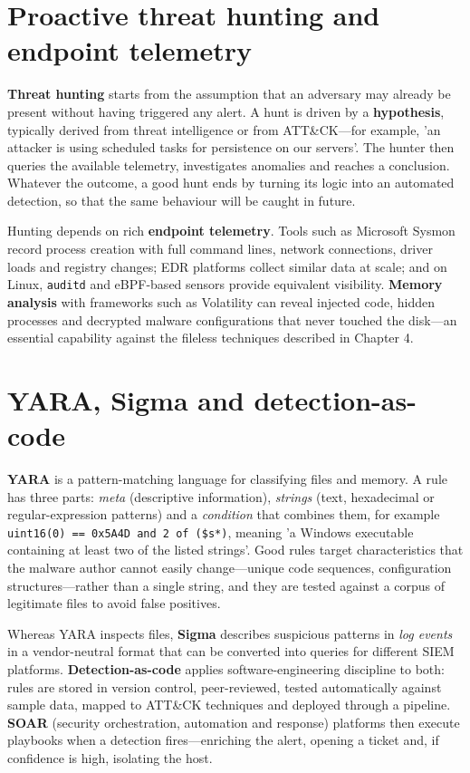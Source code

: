 \section{Proactive threat hunting and endpoint telemetry}\label{sec:11.3}
\textbf{Threat hunting} starts from the assumption that an adversary may already be present without having triggered any alert. A hunt is driven by a \textbf{hypothesis}, typically derived from threat intelligence or from ATT\&CK—for example, 'an attacker is using scheduled tasks for persistence on our servers'. The hunter then queries the available telemetry, investigates anomalies and reaches a conclusion. Whatever the outcome, a good hunt ends by turning its logic into an automated detection, so that the same behaviour will be caught in future.

Hunting depends on rich \textbf{endpoint telemetry}. Tools such as Microsoft Sysmon record process creation with full command lines, network connections, driver loads and registry changes; EDR platforms collect similar data at scale; and on Linux, \texttt{auditd} and eBPF-based sensors provide equivalent visibility. \textbf{Memory analysis} with frameworks such as Volatility can reveal injected code, hidden processes and decrypted malware configurations that never touched the disk—an essential capability against the fileless techniques described in Chapter 4.

\section{YARA, Sigma and detection-as-code}\label{sec:11.4}
\textbf{YARA} is a pattern-matching language for classifying files and memory. A rule has three parts: \emph{meta} (descriptive information), \emph{strings} (text, hexadecimal or regular-expression patterns) and a \emph{condition} that combines them, for example \texttt{uint16(0) == 0x5A4D and 2 of (\$s*)}, meaning 'a Windows executable containing at least two of the listed strings'. Good rules target characteristics that the malware author cannot easily change—unique code sequences, configuration structures—rather than a single string, and they are tested against a corpus of legitimate files to avoid false positives.

Whereas YARA inspects files, \textbf{Sigma} describes suspicious patterns in \emph{log events} in a vendor-neutral format that can be converted into queries for different SIEM platforms. \textbf{Detection-as-code} applies software-engineering discipline to both: rules are stored in version control, peer-reviewed, tested automatically against sample data, mapped to ATT\&CK techniques and deployed through a pipeline. \textbf{SOAR} (security orchestration, automation and response) platforms then execute playbooks when a detection fires—enriching the alert, opening a ticket and, if confidence is high, isolating the host.

